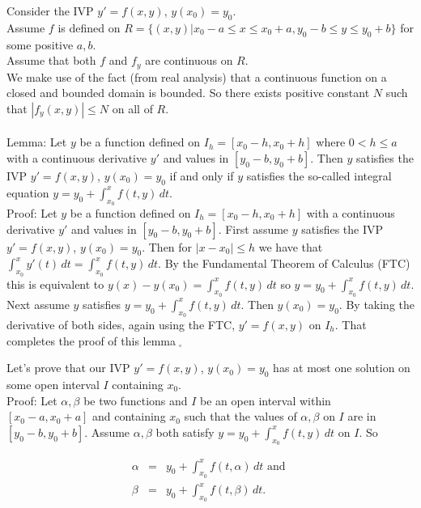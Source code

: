 \documentclass{ximera}
\begin{document}
Consider the IVP $y'=f(x,y)$, $y(x_0)=y_0$.\\

Assume $f$ is defined on $R=\{(x,y)|x_0-a\leq x\leq x_0+a,y_0-b\leq y\leq y_0+b\}$ for some positive $a,b$.\\

Assume that both $f$ and $f_y$ are continuous on $R$.\\

We make use of the fact (from real analysis) that a continuous function on a closed and bounded domain is bounded.  So there exists positive constant $N$ such that $|f_y(x,y)|\leq N$ on all of $R$.\\ \\

Lemma: Let $y$ be a function defined on $I_h=[x_0-h,x_0+h]$ where $0<h\leq a$ with a continuous derivative $y'$ and values in $[y_0-b,y_0+b]$.  Then $y$ satisfies the IVP $y'=f(x,y)$, $y(x_0)=y_0$ if and only if $y$ satisfies the so-called integral equation $\displaystyle y=y_0+\int_{x_0}^x f(t,y)\,dt$.\\

Proof: Let $y$ be a function defined on $I_h=[x_0-h,x_0+h]$ with a continuous derivative $y'$ and values in $[y_0-b,y_0+b]$.  First assume $y$ satisfies the IVP $y'=f(x,y)$, $y(x_0)=y_0$.  Then for $|x-x_0|\leq h$ we have that\\ $\displaystyle \int_{x_0}^x y'(t) \,dt=\int_{x_0}^x f(t,y)\,dt$.  By the Fundamental Theorem of Calculus (FTC) this is equivalent to $\displaystyle y(x)-y(x_0)=\int_{x_0}^x f(t,y)\,dt$ so $\displaystyle y=y_0+\int_{x_0}^x f(t,y)\,dt$.  Next assume $y$ satisfies $\displaystyle y=y_0+\int_{x_0}^x f(t,y)\,dt$.  Then $y(x_0)=y_0$.  By taking the derivative of both sides, again using the FTC, $y'=f(x,y)$ on $I_h$. That completes the proof of this lemma$\;_{\square}$

\newpage


Let's prove that our IVP $y'=f(x,y)$, $y(x_0)=y_0$ has at most one solution on some open interval $I$ containing $x_0$.\\

Proof:  Let $\alpha,\beta$ be two functions and $I$ be an open interval within $[x_0-a,x_0+a]$ and containing $x_0$ such that the values of $\alpha,\beta$ on $I$ are in $[y_0-b,y_0+b]$.  Assume $\alpha,\beta$ both satisfy $\displaystyle y=y_0+\int_{x_0}^x f(t,y)\,dt$ on $I$.  So

\begin{eqnarray*}
  \alpha &=& y_0+\int_{x_0}^x f(t,\alpha)\,dt \mbox { and }\\
  \beta &=& y_0+\int_{x_0}^x f(t,\beta)\,dt. \\
\end{eqnarray*}
\end{document}
